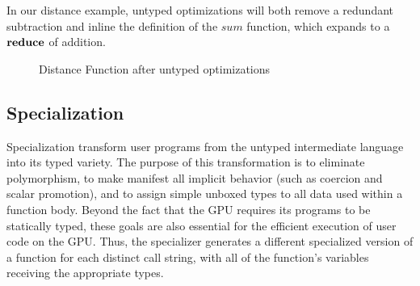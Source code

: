\documentclass[preprint]{sigplanconf}
\begin{document}
In our distance example, untyped optimizations will both remove a redundant subtraction and inline the definition of the $sum$ function, which expands to a $\mbox{\textbf{reduce}}$ of addition.
\begin{figure}[h!]
\caption{Distance Function after untyped optimizations}
\end{figure}

\subsection{Specialization}
Specialization transform user programs from the untyped intermediate language into its typed variety. The purpose of this transformation is to eliminate polymorphism, to make manifest all implicit behavior (such as coercion and scalar promotion), and to assign simple unboxed types to all data used within a function body. Beyond the fact that the GPU requires its programs to be statically typed, these goals are also essential for the efficient execution of user code on the GPU. Thus, the specializer generates a different specialized version of a function for each distinct call string, with all of the function's variables receiving the appropriate types.
\end{document}
